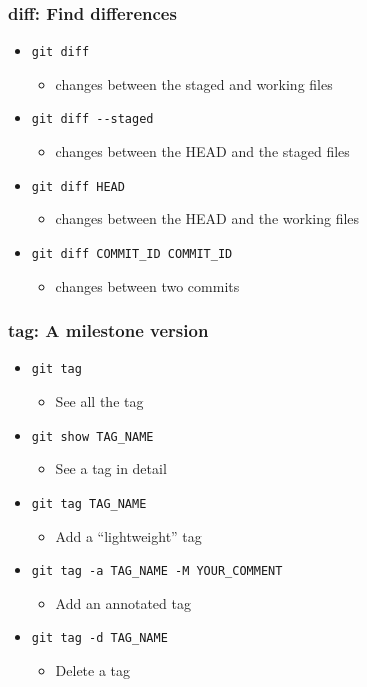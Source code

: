 \documentclass[11pt,ignorenonframetext,]{beamer}
\begin{document}
\begin{frame}[fragile, label=gitdiff]\frametitle{diff: Find differences}

\begin{itemize}
\item
  \texttt{git diff}
  \begin{itemize}
  \item
    changes between the staged and working files
  \end{itemize}
\item
  \texttt{git diff -{}-staged}
  \begin{itemize}
  \item
    changes between the HEAD and the staged files
  \end{itemize}
\item
  \texttt{git diff HEAD}
  \begin{itemize}
  \item
    changes between the HEAD and the working files
  \end{itemize}
\item
  \texttt{git diff COMMIT\_ID COMMIT\_ID}
  \begin{itemize}
  \item
    changes between two commits
  \end{itemize}
\end{itemize}
\end{frame}

\begin{frame}\frametitle{tag: A milestone version}

\begin{itemize}
\item
  \texttt{git tag}
  \begin{itemize}
  \item
    See all the tag
  \end{itemize}
\item
  \texttt{git show TAG\_NAME}
  \begin{itemize}
  \item
    See a tag in detail
  \end{itemize}
\item
  \texttt{git tag TAG\_NAME}
  \begin{itemize}
  \item
    Add a ``lightweight'' tag
  \end{itemize}
\item
  \texttt{git tag -a TAG\_NAME -M YOUR\_COMMENT}
  \begin{itemize}
  \item
    Add an annotated tag
  \end{itemize}
\item
  \texttt{git tag -d TAG\_NAME}
  \begin{itemize}
  \item
    Delete a tag
  \end{itemize}
\end{itemize}
\end{frame}
\end{document}
